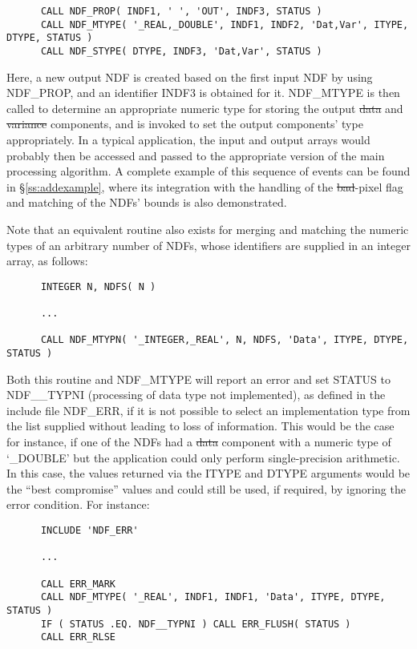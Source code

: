 \small
\begin{verbatim}
      CALL NDF_PROP( INDF1, ' ', 'OUT', INDF3, STATUS )
      CALL NDF_MTYPE( '_REAL,_DOUBLE', INDF1, INDF2, 'Dat,Var', ITYPE, DTYPE, STATUS )
      CALL NDF_STYPE( DTYPE, INDF3, 'Dat,Var', STATUS )
\end{verbatim}
\normalsize

Here, a new output NDF is created based on the first input NDF by using
NDF\_PROP, and an identifier INDF3 is obtained for it.
NDF\_MTYPE is then called to determine an appropriate numeric type for
storing the output \st{data\/} and \st{variance\/} components, and 
is invoked to set the output components' type appropriately. 
In a typical application, the input and output arrays would probably then be
accessed and passed to the appropriate version of the main processing
algorithm.
A complete example of this sequence of events can be found in 
\S\ref{ss:addexample}, where its integration with the handling of the
\st{bad\/}-pixel flag and matching of the NDFs' bounds is also
demonstrated.  

Note that an equivalent routine  also exists for merging and
matching the numeric types of an arbitrary number of NDFs, whose identifiers
are supplied in an integer array, as follows: 

\small
\begin{verbatim}
      INTEGER N, NDFS( N )

      ...

      CALL NDF_MTYPN( '_INTEGER,_REAL', N, NDFS, 'Data', ITYPE, DTYPE, STATUS )
\end{verbatim}
\normalsize

Both this routine and NDF\_MTYPE will report an error and set STATUS to
NDF\_\_TYPNI (processing of data type not implemented), as defined in the
include file NDF\_ERR, if it is not possible to select an implementation
type from the list supplied without leading to loss of information. 
This would be the case for instance, if one of the NDFs had a \st{data\/}
component with a numeric type of `\_DOUBLE' but the application could only
perform single-precision arithmetic. 
In this case, the values returned via the ITYPE and DTYPE arguments would be
the ``best compromise'' values and could still be used, if required, by
ignoring the error condition. 
For instance:

\small
\begin{verbatim}
      INCLUDE 'NDF_ERR'

      ...

      CALL ERR_MARK
      CALL NDF_MTYPE( '_REAL', INDF1, INDF1, 'Data', ITYPE, DTYPE, STATUS )
      IF ( STATUS .EQ. NDF__TYPNI ) CALL ERR_FLUSH( STATUS )
      CALL ERR_RLSE
\end{verbatim}      
\normalsize

